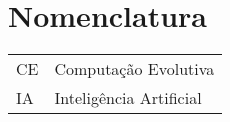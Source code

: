 
\chapter*{Nomenclatura}

\begin{tabular*}{20cm}{lp{12cm}}
CE & Computação Evolutiva \\
IA & Inteligência Artificial \\
\end{tabular*}


